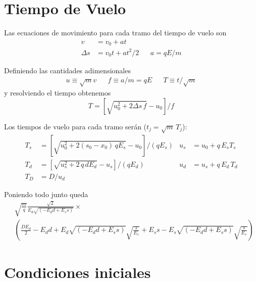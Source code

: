 \documentclass[12pt,spanish]{article}
\begin{document}
\section{Tiempo de Vuelo}
\label{S:tiempo-de-vuelo}

Las ecuaciones de movimiento para cada tramo del tiempo de vuelo son
\begin{align*}
  v &= v_{0} + a t \\
  \Delta s &= v_{0} t + a t^{2}/2
&&
a = q E /m 
\end{align*}

Definiendo las cantidades adimensionales
\begin{align*}
  u \equiv \sqrt{m} v && f\equiv a/m = qE  && T \equiv t/\sqrt{m}
\end{align*}
y resolviendo el tiempo obtenemos
\begin{equation*}
  T = \left[\sqrt{u_{0}^{2} + 2 \Delta s\, f} - u_{0}\right]/f
\end{equation*}

Los tiempos de vuelo para cada tramo ser\'{a}n ($t_{j} = \sqrt{m}\,T_{j}$):
\begin{align*}
  T_{s} &=  \left[\sqrt{u_{0}^{2} + 2 (s_{0} - x_{0})\, q E_{s}} - u_{0}\right]/(q E_{s}) & u_{s} &= u_{0} + q \,E_{s} T_{s} \\
  T_{d} &=  \left[\sqrt{u_{s}^{2} + 2\, q\,d E_{d}} - u_{s}\right]/(q E_{d}) & u_{d} &= u_{s} + q\, E_{d} \,T_{d} \\
  T_{D} &=  D/u_{d}
\end{align*}

Poniendo todo junto queda
\begin{align}
  \label{Q:ec-final}
  &  \sqrt{\frac{m}{q}}\frac{\sqrt{2}}{E_{d} \sqrt{\left(- E_{d} d + E_{s} s\right)}}\times \\ &
 \left(\frac{D E_{d}}{2} - E_{d} d + E_{d} \sqrt{\left(- E_{d} d + E_{s} s\right)} \sqrt{\frac{s}{E_{s}}} + E_{s} s - E_{s} \sqrt{\left(- E_{d} d + E_{s} s\right)} \sqrt{\frac{s}{E_{s}}}\right)
\end{align}
\section{Condiciones iniciales}
\label{S:cond-inic}
\end{document}
